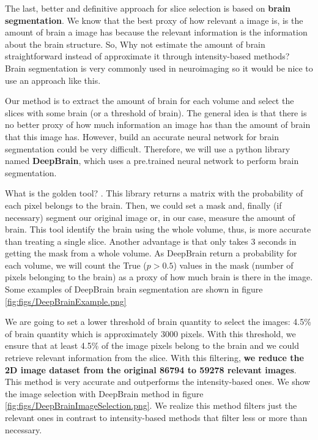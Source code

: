 The last, better and definitive approach for slice selection is based on \textbf{brain segmentation}. We know that the best proxy of how relevant a image is, is the amount of brain a image has because the relevant information is the information about the brain structure. So, Why not estimate the amount of brain straightforward instead of approximate it through intensity-based methods? Brain segmentation is very commonly used in neuroimaging so it would be nice to use an approach like this.

Our method is to extract the amount of brain for each volume and select the slices with some brain (or a threshold of brain). The general idea is that there is no better proxy of how much information an image has than the amount of brain that this image has. However, build an accurate neural network for brain segmentation could be very difficult. Therefore, we will use a python library named \textbf{DeepBrain}, which uses a pre.trained neural network to perform brain segmentation.

What is the golden tool? . This library returns a matrix with the probability of each pixel belongs to the brain. Then, we could set a mask and, finally (if necessary) segment our original image or, in our case, measure the amount of brain. This tool identify the brain using the whole volume, thus, is more accurate than treating a single slice. Another advantage is that only takes 3 seconds in getting the mask from a whole volume. As DeepBrain return a probability for each volume, we will count the True ($p>0.5$) values in the mask (number of pixels belonging to the brain) as a proxy of how much brain is there in the image.  Some examples of DeepBrain brain segmentation are shown in figure \ref{fig:figs/DeepBrainExample.png}


We are going to set a lower threshold of brain quantity to select the images: 4.5\% of brain quantity which is approximately 3000 pixels. With this threshold, we ensure that at least 4.5\% of the image pixels belong to the brain and we could retrieve relevant information from the slice. With this filtering, \textbf{we reduce the 2D image dataset from the original 86794 to 59278 relevant images}. This method is very accurate and outperforms the intensity-based ones. We show the image selection with DeepBrain method in figure \ref{fig:figs/DeepBrainImageSelection.png}. We realize this method filters just the relevant ones in contrast to intensity-based methods that filter less or more than necessary.

